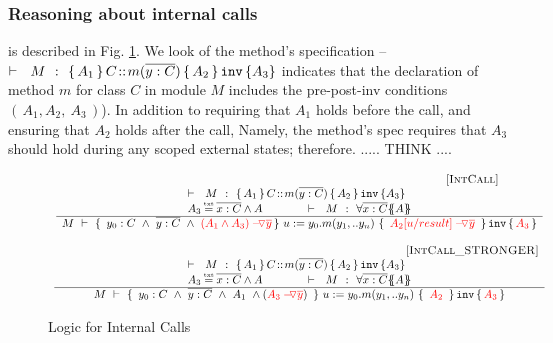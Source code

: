 {\subsubsection{Reasoning about internal calls}
is described in Fig. \ref{f:internal:calls}.
We look of the method's specification -- $ {\vdash \ \ M\ \ \mathbf{:}\ \  \{\, A_1\, \}\, C\!::\!m(\overline{y:C})\, \{\, A_2\, \} \, {\texttt{inv}}\, \{ A_3 \}}  $  indicates that the declaration of method $m$ for class $C$ in module $M$ includes the pre-post-inv conditions $(\, A_1, A_2, \ A_3\, ) $). 
In addition to requiring that $A_1$ holds before the call, and ensuring that $A_2$ holds after the call,
 Namely,  the method's spec requires that $A_3$ should hold during any scoped external states;
 therefore. ..... THINK ....   %
%



 
\begin{figure}[thb]
$\begin{array}{c}
\inferruleSD{\hspace{4.7cm} [\sc{IntCall}]}
	{
	   	\begin{array}{l}
		\promises  M {\mprepostN{A_1}{C}{m}{y}{C}{A_2} {A_3}}  
		\\
		A_3 \txteq \overline {x:C} \wedge A \hspace{1.4cm}
		\promises {M} {\TwoStatesN  {\overline {x:C}} {A}}
          	\end{array}
		}
	{  \hprovesN {M} 
						{ \  y_0:C  \ \wedge\ \overline {y:C}\ \wedge \ \red{\PushAS {y}{(A_1 \wedge A_3)}}}
						{ \ u:=y_0.m(y_1,.. y_n)\    }
						{ \ \red{ \PushAS {y}{A_2[ u/result]}}  \ }
						{ \red {A_3} }	
}
 \\
 \\
 \inferruleSD{\hspace{4.7cm} [\sc{IntCall\_STRONGER}]}
	{
	   	
	   	\begin{array}{l}
		\promises  M {\mprepostN{A_1}{C}{m}{y}{C}{A_2} {A_3}}  
		\\
		A_3 \txteq \overline {x:C} \wedge A \hspace{1.4cm}
		\promises {M} {\TwoStatesN  {\overline {x:C}} {A}}
          	\end{array}
          		}
	{  \hprovesN {M} 
						{ \  y_0:C  \ \wedge\ \overline {y:C}\ \wedge \ A_1\ \wedge (\red{\PushAS {y}{A_3}})\  }
						{ \ u:=y_0.m(y_1,.. y_n)\    }
						{ \ \red{ A_2}  \ }
						{\red {A_3}}	
 }
\end{array}$
\caption{Logic for Internal Calls}
\label{f:internal:calls}
\end{figure}

}
